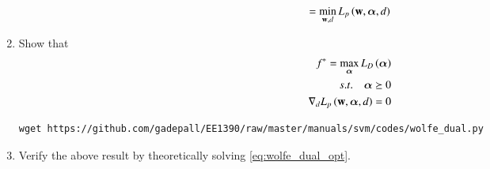 \documentclass[journal,12pt,twocolumn]{IEEEtran}
\renewcommand\thesection{\arabic{section}}
\begin{document}
\begin{enumerate}[label=\thesection.\arabic*,ref=\thesection.\theenumi]
\begin{align}
=\min_{\mathbf{w},d}L_p\left(\mathbf{w},\bm{\alpha},d\right)
\end{align}
\item Show that 
\begin{align}
\label{eq:wolfe_dual_opt}
f^* = 
\max_{\bm{\alpha}}L_D\left(\bm{\alpha}\right)
\\
s.t. \quad \bm{\alpha} \succeq 0
\\
\nabla_{d}L_p\left(\mathbf{w},\bm{\alpha},d\right) = 0
\end{align}
\solution
\begin{lstlisting}
wget https://github.com/gadepall/EE1390/raw/master/manuals/svm/codes/wolfe_dual.py
\end{lstlisting}
\item Verify the above result by theoretically solving \eqref{eq:wolfe_dual_opt}.
%
%
%

\end{enumerate}
\end{document}
